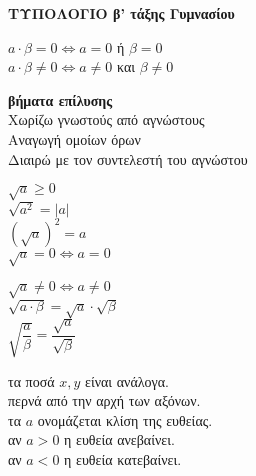 \documentclass[a4paper,landscape,2pt]{book}
\begin{document}
\newpage
\begin{center}
    {\Large \textbf{ΤΥΠΟΛΟΓΙΟ β' τάξης Γυμνασίου}}
\end{center}

\begin{multicols}{3}

\mybullet $a\cdot\beta=0\Leftrightarrow a=0$ ή $\beta=0$ \\
\mybullet $a\cdot\beta\ne0\Leftrightarrow a\ne0$ και $\beta\ne0$

\noindent\textbf{βήματα επίλυσης}\\
\mybullet Χωρίζω γνωστούς από αγνώστους \\
\mybullet Αναγωγή ομοίων όρων \\
\mybullet Διαιρώ με τον συντελεστή του αγνώστου \\



\begin{minipage}{.5\linewidth}
\mybullet $\sqrt{a}\ge0$ \\
\mybullet $\sqrt{a^2}=|a|$ \\
\mybullet $\left(\sqrt{a}\right)^2=a$ \\
\mybullet $\sqrt{a}=0\Leftrightarrow a=0$ \\
\end{minipage}
\begin{minipage}{.5\linewidth}
\mybullet $\sqrt{a}\ne0\Leftrightarrow a\ne0$ \\
\mybullet $\sqrt{a\cdot\beta}=\sqrt{a}\cdot \sqrt{\beta}$ \\
\mybullet $\sqrt{\dfrac{a}{\beta}}=\dfrac{\sqrt{a}}{\sqrt{\beta}}$ \\
\end{minipage}



\mybullet τα ποσά $x,y$ είναι ανάλογα. \\
\mybullet περνά από την αρχή των αξόνων. \\
\mybullet τα $a$ ονομάζεται κλίση της ευθείας. \\
\mybullet αν $a>0$ η ευθεία ανεβαίνει. \\
\mybullet αν $a<0$ η ευθεία κατεβαίνει. \\



\end{multicols}
\end{document}
